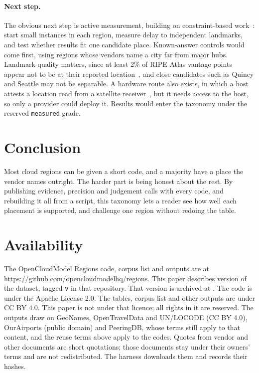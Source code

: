 \documentclass[10pt,twocolumn]{article}
\newcommand{\code}[1]{\texttt{#1}}
\begin{document}
\paragraph{Next step.} The obvious next step is active measurement, building on constraint-based work~\citep{gondree2013geolocation}: start small instances in each region, measure delay to independent landmarks, and test whether results fit one candidate place. Known-answer controls would come first, using regions whose vendors name a city far from major hubs. Landmark quality matters, since at least 2\% of RIPE Atlas vantage points appear not to be at their reported location~\citep{izhikevich2024rooting}, and close candidates such as Quincy and Seattle may not be separable. A hardware route also exists, in which a host attests a location read from a satellite receiver~\citep{abbas2023enforcing}, but it needs access to the host, so only a provider could deploy it. Results would enter the taxonomy under the reserved \code{measured} grade.

\section{Conclusion}

Most cloud regions can be given a short code, and a majority have a place the vendor names outright. The harder part is being honest about the rest. By publishing evidence, precision and judgement calls with every code, and rebuilding it all from a script, this taxonomy lets a reader see how well each placement is supported, and challenge one region without redoing the table.

\section*{Availability}
The OpenCloudModel Regions code, corpus list and outputs are at \url{https://github.com/opencloudmodelhq/regions}. This paper describes version \datasetVersion{} of the dataset, tagged \code{v\datasetVersion{}} in that repository. That version is archived at . The code is under the Apache License 2.0. The tables, corpus list and other outputs are under CC BY 4.0. This paper is not under that licence; all rights in it are reserved. The outputs draw on GeoNames, OpenTravelData and UN/LOCODE (CC BY 4.0), OurAirports (public domain) and PeeringDB, whose terms still apply to that content, and the reuse terms above apply to the codes. Quotes from vendor and other documents are short quotations; those documents stay under their owners' terms and are not redistributed. The harness downloads them and records their hashes.
\end{document}
